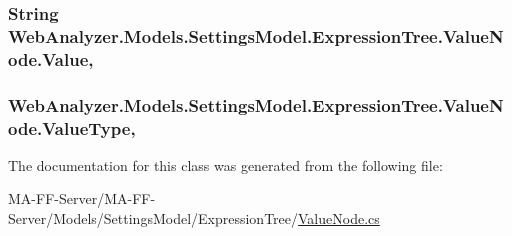 \subsubsection[{Value}]{\setlength{\rightskip}{0pt plus 5cm}String Web\+Analyzer.\+Models.\+Settings\+Model.\+Expression\+Tree.\+Value\+Node.\+Value\hspace{0.3cm}{\ttfamily [get]}, {\ttfamily [set]}}\label{class_web_analyzer_1_1_models_1_1_settings_model_1_1_expression_tree_1_1_value_node_abc4f8ff5dd972ce1c49f135273797926}
\hypertarget{class_web_analyzer_1_1_models_1_1_settings_model_1_1_expression_tree_1_1_value_node_aa1c55c593ae80ac78221c1397ede5ab2}{}
\subsubsection[{Value\+Type}]{ Web\+Analyzer.\+Models.\+Settings\+Model.\+Expression\+Tree.\+Value\+Node.\+Value\+Type\hspace{0.3cm}{\ttfamily [get]}, {\ttfamily [set]}}\label{class_web_analyzer_1_1_models_1_1_settings_model_1_1_expression_tree_1_1_value_node_aa1c55c593ae80ac78221c1397ede5ab2}


The documentation for this class was generated from the following file\+:\begin{DoxyCompactItemize}
\item 
M\+A-\/\+F\+F-\/\+Server/\+M\+A-\/\+F\+F-\/\+Server/\+Models/\+Settings\+Model/\+Expression\+Tree/\hyperlink{_value_node_8cs}{Value\+Node.\+cs}\end{DoxyCompactItemize}
